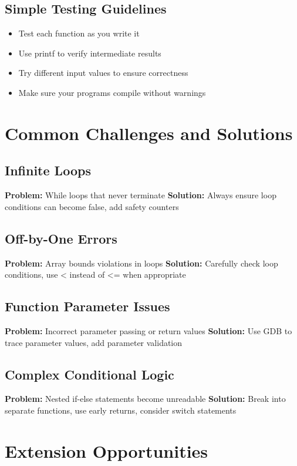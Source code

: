 \documentclass[11pt,a4paper]{article}
\begin{document}
\subsection{Simple Testing Guidelines}
\begin{itemize}
    \item Test each function as you write it
    \item Use printf to verify intermediate results
    \item Try different input values to ensure correctness
    \item Make sure your programs compile without warnings
\end{itemize}

\section{Common Challenges and Solutions}

\subsection{Infinite Loops}
\textbf{Problem:} While loops that never terminate
\textbf{Solution:} Always ensure loop conditions can become false, add safety counters

\subsection{Off-by-One Errors}
\textbf{Problem:} Array bounds violations in loops
\textbf{Solution:} Carefully check loop conditions, use < instead of <= when appropriate

\subsection{Function Parameter Issues}
\textbf{Problem:} Incorrect parameter passing or return values
\textbf{Solution:} Use GDB to trace parameter values, add parameter validation

\subsection{Complex Conditional Logic}
\textbf{Problem:} Nested if-else statements become unreadable
\textbf{Solution:} Break into separate functions, use early returns, consider switch statements

\section{Extension Opportunities}
\end{document}
